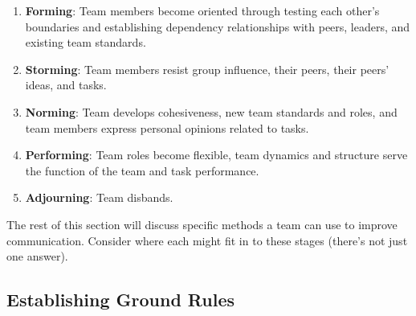 \begin{enumerate}
    \item \textbf{Forming}: Team members become oriented through testing each other's boundaries and establishing dependency relationships with peers, leaders, and existing team standards.
    \item \textbf{Storming}: Team members resist group influence, their peers, their peers' ideas, and tasks.
    \item \textbf{Norming}: Team develops cohesiveness, new team standards and roles, and team members express personal opinions related to tasks.
    \item \textbf{Performing}: Team roles become flexible, team dynamics and structure serve the function of the team and task performance.
    \item \textbf{Adjourning}: Team disbands.
\end{enumerate}

The rest of this section will discuss specific methods a team can use to improve communication. Consider where each might fit in to these stages (there's not just one answer).

\subsection{Establishing Ground Rules}

